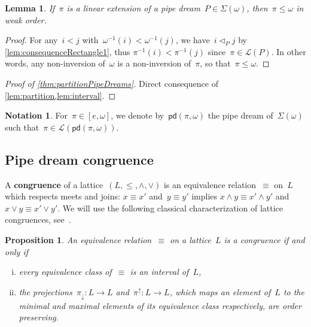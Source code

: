 \documentclass{amsart}
\newtheorem{proposition}[theorem]{Proposition}
\newtheorem{lemma}[theorem]{Lemma}
\theoremstyle{definition}
\newtheorem{notation}[theorem]{Notation}
\newcommand{\defn}[1]{\textbf{\textsf{\color{PineGreen} #1}}} %
\newcommand{\acyclicPipeDreams}{\Sigma} %
\newcommand{\linearExtensions}{\mathcal{L}} %
\newcommand{\insertion}[2]{\mathsf{pd}(#1,#2)} %
\newcommand{\meet}{\wedge} %
\newcommand{\join}{\vee} %
\newcommand{\less}{\vartriangleleft} %
\newcommand{\contactLess}[1]{\less_{#1}} %
\newcommand{\projDown}{\pi_\downarrow} %
\newcommand{\projUp}{\pi^\uparrow} %
\begin{document}
\begin{lemma}
\label{lem:interval}
If~$\pi$ is a linear extension of a pipe dream~$P \in \acyclicPipeDreams(\omega)$, then~$\pi \le \omega$ in weak order.
\end{lemma}

\begin{proof}
For any~$i < j$ with~$\omega^{-1}(i) < \omega^{-1}(j)$, we have~$i \contactLess{P} j$ by \cref{lem:consequenceRectangle1}, thus ${\pi^{-1}(i) < \pi^{-1}(j)}$ since~$\pi \in \linearExtensions(P)$.
In other words, any non-inversion of~$\omega$ is a non-inversion of~$\pi$, so that~${\pi \le \omega}$.
\end{proof}

\begin{proof}[Proof of \cref{thm:partitionPipeDreams}]
Direct consequence of \cref{lem:partition,lem:interval}.
\end{proof}

\begin{notation}
For~$\pi \in [e, \omega]$, we denote by~$\insertion{\pi}{\omega}$ the pipe dream of~$\acyclicPipeDreams(\omega)$ such that~${\pi \in \linearExtensions(\insertion{\pi}{\omega})}$.
\end{notation}


\subsection{Pipe dream congruence}
\label{subsec:pipeDreamCongruence}

A \defn{congruence} of a lattice~$(L, \le, \meet, \join)$ is an equivalence relation~$\equiv$ on~$L$ which respects meets and joins: $x \equiv x'$ and~$y \equiv y'$ implies $x \meet y \equiv x' \meet y'$ and~$x \join y \equiv x' \join y'$.
We will use the following classical characterization of lattice congruences, see~\cite{Reading-PosetRegionsChapter}.

\begin{proposition}
\label{prop:characterizationCongruences}
An equivalence relation~$\equiv$ on a lattice~$L$ is a congruence if and only if
\begin{enumerate}[(i)]
\item every equivalence class of~$\equiv$ is an interval of~$L$,
\item the projections~$\projDown : L \to L$ and~$\projUp : L \to L$, which maps an element of~$L$ to the minimal and maximal elements of its equivalence class respectively, are order preserving.
\end{enumerate}
\end{proposition}
\end{document}
